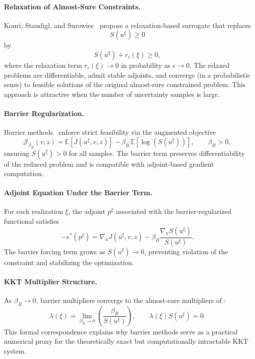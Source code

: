 \documentclass{article}
\newcommand{\1}{\mathds{1}}          %
\theoremstyle{definition}
\begin{document}
\begin{sloppypar}
\paragraph{Relaxation of Almost-Sure Constraints.}
Kouri, Staudigl, and Surowiec~\cite{kouri2023relaxation} propose a relaxation-based surrogate that replaces
\[
S(u^{\xi})\ge 0 
\]
by
\[
S(u^{\xi}) + r_\epsilon(\xi) \ge 0,
\]
where the relaxation term $r_\epsilon(\xi)\to 0$ in probability as $\epsilon\to 0$. The relaxed problems are differentiable, admit stable adjoints, and converge (in a probabilistic sense) to feasible solutions of the original almost-sure constrained problem. This approach is attractive when the number of uncertainty samples is large.

\paragraph{Barrier Regularization.}
Barrier methods~\cite{schiela2009barrier} enforce strict feasibility via the augmented objective
\[
\mathcal{J}_{\beta_B}(v,z)
=
\mathbb{E}[J(u^{\xi},v,z)] 
-
\beta_B\,\mathbb{E}\!\left[\log(S(u^{\xi}))\right],
\qquad 
\beta_B > 0,
\]
ensuring $S(u^{\xi})>0$ for all samples. The barrier term preserves differentiability of the reduced problem and is compatible with adjoint-based gradient computation.

\paragraph{Adjoint Equation Under the Barrier Term.}
For each realization $\xi$, the adjoint $p^{\xi}$ associated with the barrier-regularized functional satisfies
\[
-e^*(p^{\xi})
=
\nabla_u J(u^{\xi},v,z)
-
\beta_B \frac{\nabla_u S(u^{\xi})}{S(u^{\xi})}.
\]
The barrier forcing term grows as $S(u^{\xi})\to 0$, preventing violation of the constraint and stabilizing the optimization.

\paragraph{KKT Multiplier Structure.}
As $\beta_B\to 0$, barrier multipliers converge to the almost-sure multipliers of 
\cite{geiersbach2021optimality}:
\[
\lambda(\xi)
=
\lim_{\beta_B\to 0}
\left(
\frac{\beta_B}{S(u^{\xi})}
\right),
\qquad 
\lambda(\xi) S(u^{\xi}) = 0.
\]
This formal correspondence explains why barrier methods serve as a practical numerical proxy for the theoretically exact but computationally intractable KKT system.


\end{sloppypar}
\end{document}
